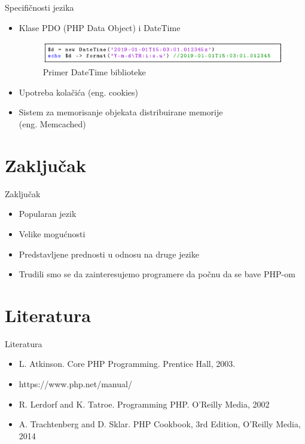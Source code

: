 \documentclass{beamer}
\begin{document}
\begin{frame}{Specifičnosti jezika}
    \begin{itemize}
        \item Klase PDO (PHP Data Object) i DateTime
        
        \begin{figure}[h!]
        \begin{center}
        \includegraphics[scale=0.45]{datetime.png}
        \end{center}
        \caption{Primer DateTime biblioteke}
        \label{fig:datetime}
        \end{figure}
        
        \item Upotreba kolačića (eng. cookies)
        \item Sistem za memorisanje objekata distribuirane memorije \\ (eng. Memcached)
    \end{itemize}
\end{frame}


\section{Zaključak}
\begin{frame}{Zaključak}
    \begin{itemize}
    \item Popularan jezik
    \item Velike mogućnosti 
    \item Predstavljene prednosti u odnosu na druge jezike
    \item Trudili smo se da zainteresujemo programere da počnu da se bave PHP-om
    \end{itemize}
\end{frame}


\section{Literatura}
\begin{frame}{Literatura}
    \begin{itemize}
        \item L. Atkinson. Core PHP Programming. Prentice Hall, 2003.
        \item https://www.php.net/manual/
        \item R. Lerdorf and K. Tatroe. Programming PHP. O'Reilly Media, 2002
        \item A. Trachtenberg and D. Sklar. PHP Cookbook, 3rd Edition,  O'Reilly Media, 2014
    \end{itemize}
\end{frame}
\end{document}
